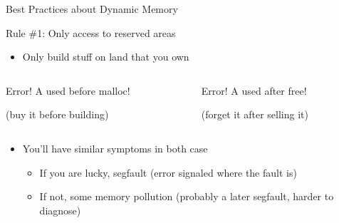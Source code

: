 \begin{frame}{Best Practices about Dynamic Memory}
  \begin{block}{\alert{Rule \#1:} Only access to reserved areas}
    \begin{itemize}
    \item {} Only build stuff on land that you own
    \end{itemize}
    \begin{columns}
      \begin{column}{.4\linewidth}
        \begin{center}

      \medskip
      \alert{Error! A used before malloc!}

      \medskip
      {\small (buy it before building)}
    \end{center}
  \end{column}
  \begin{column}{.4\linewidth}
    \begin{center}

      \medskip
      \alert{Error! A used after free!}

      \medskip
      {\small(forget it after selling it)}
    \end{center}
  \end{column}
\end{columns}\medskip
\begin{itemize}
\item You'll have similar symptoms in both case
  \begin{itemize}
  \item If you are lucky, segfault (error signaled where the fault is)
  \item If not, some memory pollution (probably a later segfault, harder to
    diagnose)
  \end{itemize}

\end{itemize}

  \end{block}
\end{frame}
